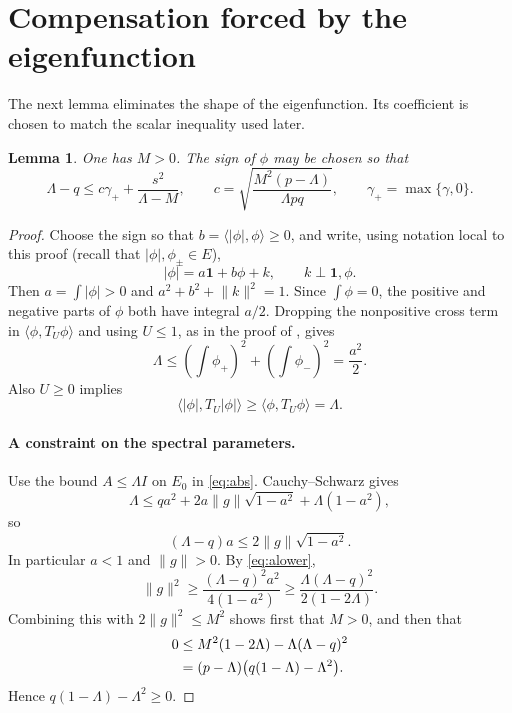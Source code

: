 \documentclass[11pt]{article}
\numberwithin{equation}{section}
\newtheorem{lemma}[theorem]{Lemma}
\theoremstyle{remark}
\newcommand{\one}{\mathbf 1}
\newcommand{\norm}[1]{\lVert #1\rVert}
\newcommand{\ip}[2]{\langle #1,#2\rangle}
\begin{document}
\section{Compensation forced by the eigenfunction}
The next lemma eliminates the shape of the eigenfunction. Its coefficient is chosen to match the scalar inequality used later.
\begin{lemma}\label{lem:comp}
One has $M>0$. The sign of $\phi$ may be chosen so that
\begin{equation}\label{eq:comp}
 \Lambda-q\le c\gamma_++\frac{s^2}{\Lambda-M},
 \qquad c=\sqrt{\frac{M^2(p-\Lambda)}{\Lambda pq}},
 \qquad \gamma_+=\max\{\gamma,0\}.
\end{equation}
\end{lemma}
\begin{proof}
Choose the sign so that $b=\ip{|\phi|}{\phi}\ge0$, and write, using notation local to this proof (recall that $|\phi|,\phi_\pm\in E$),
\[
 |\phi|=a\one+b\phi+k,\qquad k\perp\one,\phi.
\]
Then $a=\int|\phi|>0$ and $a^2+b^2+\norm k^2=1$. Since $\int\phi=0$, the positive and negative parts of $\phi$ both have integral $a/2$. Dropping the nonpositive cross term in $\ip\phi{T_U\phi}$ and using $U\le1$, as in the proof of \cite[Lemma~2.2]{kim2026goodman}, gives
\begin{equation}\label{eq:alower}
 \Lambda\le\left(\int\phi_+\right)^2+\left(\int\phi_-\right)^2=\frac{a^2}{2}.
\end{equation}
Also $U\ge0$ implies
\begin{equation}\label{eq:abs}
 \ip{|\phi|}{T_U|\phi|}\ge\ip\phi{T_U\phi}=\Lambda.
\end{equation}

\paragraph{A constraint on the spectral parameters.}
Use the bound $A\le\Lambda I$ on $E_0$ in \eqref{eq:abs}. Cauchy--Schwarz gives
\[
 \Lambda\le qa^2+2a\norm g\sqrt{1-a^2}+\Lambda(1-a^2),
\]
so
\[
 (\Lambda-q)a\le2\norm g\sqrt{1-a^2}.
\]
In particular $a<1$ and $\norm g>0$. By \eqref{eq:alower},
\[
 \norm g^2\ge\frac{(\Lambda-q)^2a^2}{4(1-a^2)}
 \ge\frac{\Lambda(\Lambda-q)^2}{2(1-2\Lambda)}.
\]
Combining this with $2\norm g^2\le M^2$ shows first that $M>0$, and then that
\begin{align}\label{eq:admiss}
 0&\le M^2(1-2\Lambda)-\Lambda(\Lambda-q)^2\notag\\
  &=(p-\Lambda)\bigl(q(1-\Lambda)-\Lambda^2\bigr).
\end{align}
Hence $q(1-\Lambda)-\Lambda^2\ge0$.


\end{proof}
\end{document}
